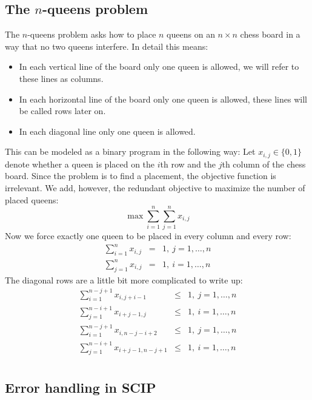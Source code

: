 \documentclass[a4paper]{article}
\begin{document}
\subsection{The $n$-queens problem}

The $n$-queens problem asks how to place $n$ queens on an $n \times n$ chess board in a way that no two queens interfere. In detail this means:
\begin{itemize}
\item In each vertical line of the board only one queen is allowed, we will refer to these lines as columns.
\item In each horizontal line of the board only one queen is allowed, these lines will be called rows later on.
\item In each diagonal line only one queen is allowed.
\end{itemize}
This can be modeled as a binary program in the following way: Let $x_{i,j} \in \{0,1\}$ denote whether a queen
is placed on the $i$th row and the $j$th column of the chess board. Since the problem is to find a placement,
the objective function is irrelevant. We add, however, the redundant objective to maximize the number of placed queens:
\[
\max \sum_{i=1}^n \sum_{j=1}^n x_{i,j}
\]
Now we force exactly one queen to be placed in every column and every row:
\begin{eqnarray*}
  \sum_{i=1}^n x_{i,j} & = & 1, \ j=1,\ldots,n \\
  \sum_{j=1}^n x_{i,j} & = & 1, \ i=1,\ldots,n
\end{eqnarray*}
The diagonal rows are a little bit more complicated to write up:
\begin{eqnarray*}
  \sum_{i=1}^{n-j+1} x_{i,j+i-1} & \leq & 1, \ j = 1, \ldots, n \\
  \sum_{j=1}^{n-i+1} x_{i+j-1,j} & \leq & 1, \ i = 1, \ldots, n \\
  \sum_{i=1}^{n-j+1} x_{i,n-j-i+2} & \leq & 1, \ j = 1, \ldots, n\\
  \sum_{j=1}^{n-i+1} x_{i+j-1,n-j+1} & \leq & 1, \ i = 1, \ldots, n\\
\end{eqnarray*}

\subsection{Error handling in SCIP}
\end{document}
